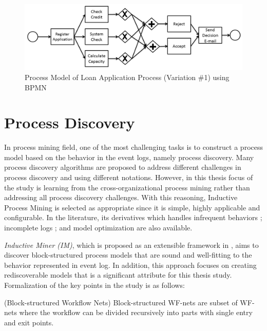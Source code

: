\begin{figure}
  \centering
  \includegraphics[width=\textwidth]{3_background/loan-bpmn}
  \caption{Process Model of Loan Application Process  (Variation \#1) using BPMN}
  \label{fig:loan-bpmn}
\end{figure}

\section{Process Discovery}
\label{sec:process-discovery}
In process mining field, one of the most challenging tasks is to construct a process model based on the behavior in the event logs, namely process discovery. Many process discovery algorithms are proposed to address different challenges in process discovery and using different notations. However, in this thesis focus of the study is learning from the cross-organizational process mining rather than addressing all process discovery challenges. With this reasoning, Inductive Process Mining \cite{leemans2013discovering} is selected as appropriate since it is simple, highly applicable and configurable. In the literature, its derivatives which handles infrequent behaviors \cite{leemans2014discoveringinfrequent}; incomplete logs \cite{leemans2014discoveringincomplete}; and model optimization \cite{weidlich2012profiles} are also available.  

\textit{Inductive Miner (IM)}, which is proposed as an extensible framework in \cite{leemans2013discovering}, aims to discover block-structured process models that are sound and well-fitting to the behavior represented in event log. In addition, this approach focuses on creating rediscoverable models that is a significant attribute for this thesis study. Formalization of the key points in the study \cite{leemans2013discovering} is as follows:

\theoremstyle{definition}
\begin{definition}{}
(Block-structured Workflow Nets) Block-structured WF-nets are subset of WF-nets where the workflow can be divided recursively into  parts with single entry and exit points.  
\end{definition}

